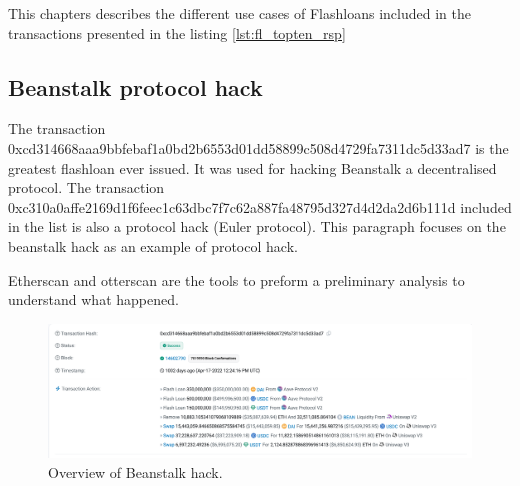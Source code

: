 \documentclass[11pt,a4paper,titlepage]{scrartcl}
\begin{document}
This chapters describes the different use cases of Flashloans included in the transactions presented in the listing \ref{lst:fl_topten_rsp}  

\subsection{Beanstalk protocol hack}

The transaction 0xcd314668aaa9bbfebaf1a0bd2b6553d01dd58899c508d4729fa7311dc5d33ad7 is the greatest flashloan ever issued. It was used for hacking Beanstalk a decentralised protocol.
The transaction 0xc310a0affe2169d1f6feec1c63dbc7f7c62a887fa48795d327d4d2da2d6b111d included in the list is also a protocol hack (Euler protocol). This  paragraph focuses on the beanstalk hack as an example of protocol hack.

 Etherscan and otterscan are the  tools to preform a preliminary analysis to understand what happened.
 
\begin{figure}[ht]
    \centering %
    \includegraphics[width=\textwidth, keepaspectratio]{image/beanstalk/etherscan1.png}
    \caption{ Overview of Beanstalk hack.}
    \label{fig:beanstalk1}
\end{figure}
 
\end{document}
